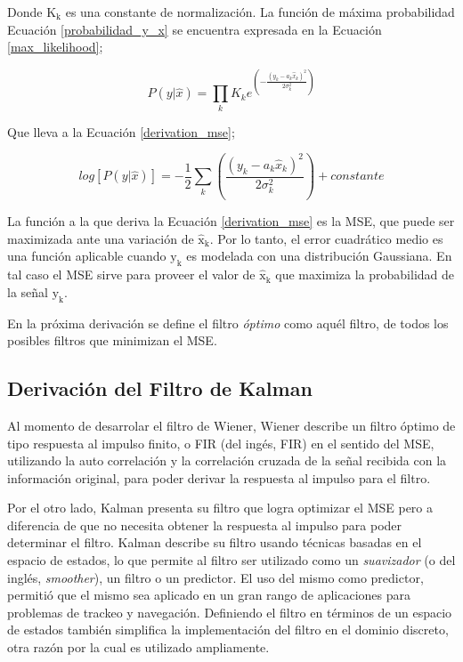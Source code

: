 \documentclass[10pt, a4paper]{article}
\begin{document}
Donde $\mathrm{K_k}$ es una constante de normalizaci\'on. La funci\'on de
m\'axima probabilidad Ecuaci\'on \ref{probabilidad_y_x} se encuentra expresada
en la Ecuaci\'on \ref{max_likelihood};

\begin{equation}
    P(y|\hat{x}) = \prod_k K_ke^{\left(- \frac{(y_k - a_k\hat{x}_k)^2}{2\sigma^2_k}\right)} \label{max_likelihood}
\end{equation}

Que lleva a la Ecuaci\'on \ref{derivation_mse};

\begin{equation}
    log[P\left(y|\hat{x}\right)] = - \frac{1}{2}\sum_k \left(\frac{(y_k -
    a_k\hat{x}_k)^2}{2\sigma^2_k}\right) + constante \label{derivation_mse}
\end{equation}

La funci\'on a la que deriva la Ecuaci\'on \ref{derivation_mse} es la
\acrshort{MSE}, que puede ser maximizada ante una variaci\'on de
$\mathrm{\hat{x}_k}$. Por lo tanto, el error cuadr\'atico medio es una funci\'on
aplicable cuando $\mathrm{y_k}$ es modelada con una distribuci\'on Gaussiana.
En tal caso el \acrshort{MSE} sirve para proveer el valor de
$\mathrm{\hat{x}_k}$ que maximiza la probabilidad de la señal $\mathrm{y_k}$.

En la pr\'oxima derivaci\'on se define el filtro \emph{\'optimo} como aqu\'el
filtro, de todos los posibles filtros que minimizan el \acrshort{MSE}.

\subsection{Derivaci\'on del Filtro de Kalman}

\noindent Al momento de desarrolar el filtro de Wiener, Wiener describe un 
filtro \'optimo de tipo respuesta al impulso finito, o \acrshort{FIR} (del 
ing\'es, \acrlong{FIR}) en el sentido del \acrshort{MSE}, utilizando la auto
correlaci\'on y la correlaci\'on cruzada de la señal recibida con la
informaci\'on original, para poder derivar la respuesta al impulso para el
filtro. 

\noindent Por el otro lado, Kalman presenta su filtro que logra optimizar el
\acrshort{MSE} pero a diferencia de que no necesita obtener la respuesta al
impulso para poder determinar el filtro. Kalman describe su filtro usando
t\'ecnicas basadas en el espacio de estados, lo que permite al filtro ser
utilizado como un \emph{suavizador} (o del ingl\'es, \emph{smoother}), un filtro
o un predictor. El uso del mismo como predictor, permiti\'o que el mismo sea
aplicado en un gran rango de aplicaciones para problemas de trackeo y
navegaci\'on. Definiendo el filtro en t\'erminos de un espacio de estados
tambi\'en simplifica la implementaci\'on del filtro en el dominio discreto, otra
raz\'on por la cual es utilizado ampliamente.
\end{document}
